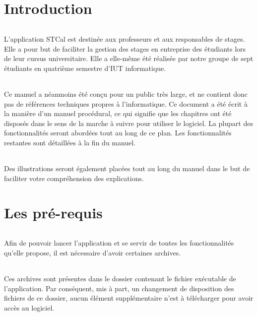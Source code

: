 \documentclass[a4paper,10pt]{book}
\begin{document}
\strut
\renewcommand{\contentsname}{Sommaire}
\tableofcontents

\part{Introduction}
  \paragraph{}
    L'application STCal est destinée aux professeurs et aux responsables de stages.
    Elle a pour but de faciliter la gestion des stages en entreprise des étudiants lors de leur cursus universitaire.
    Elle a elle-même été réalisée par notre groupe de sept étudiants en quatrième semestre d'IUT informatique.
    
  \paragraph{}
    Ce manuel a néanmoins été conçu pour un public très large, et ne contient donc pas de références techniques propres à l'informatique.
    Ce document a été écrit à la manière d'un manuel procédural, ce qui signifie que les chapitres ont été disposés dans le sens de la marche à suivre pour utiliser le logiciel.
    La plupart des fonctionnalités seront abordées tout au long de ce plan.
    Les fonctionnalités restantes sont détaillées à la fin du manuel.
  
  \paragraph{}
     Des illustrations seront également placées tout au long du manuel dans le but de faciliter votre compréhension des explications.
    

\part{Les pré-requis}
  \paragraph{}
    Afin de pouvoir lancer l'application et se servir de toutes les fonctionnalités qu'elle propose, il est nécessaire d'avoir certaines archives.
    
  \paragraph{}
    Ces archives sont présentes dans le dossier contenant le fichier exécutable de l'application. 
    Par conséquent, mis à part, un changement de disposition des fichiers de ce dossier, aucun élément supplémentaire n'est à télécharger pour avoir accès au logiciel.
\end{document}
